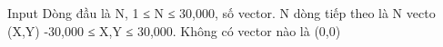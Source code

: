 Input
Dòng đầu là N, 1 ≤ N ≤ 30,000, số vector. N dòng tiếp theo là N vecto (X,Y) -30,000 ≤ X,Y ≤ 30,000. Không có vector nào là (0,0)